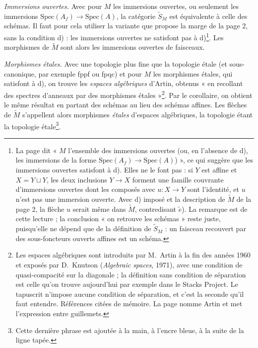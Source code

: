 \documentclass[11pt,a4paper]{article}
\begin{document}
\emph{Immersions ouvertes.} Avec pour $M$ les immersions ouvertes, ou seulement
les immersions $\mathrm{Spec}(A_f) \to \mathrm{Spec}(A)$, la catégorie
$\widetilde{S}_M$ est équivalente à celle des schémas. Il faut pour cela
utiliser la variante que propose la marge de la page 2, sans la condition d) :
les immersions ouvertes ne satisfont pas à d)\footnote{La page dit « $M$
l'ensemble des immersions ouvertes (ou, en l'absence de d), les immersions de
la forme $\mathrm{Spec}(A_f) \to \mathrm{Spec}(A)$) », ce qui suggère que les
immersions ouvertes satisfont à d). Elles ne le font pas : si $Y$ est affine et
$X = Y \sqcup Y$, les deux inclusions $Y \to X$ forment une famille couvrante
d'immersions ouvertes dont les composés avec $u : X \to Y$ sont l'identité, et
$u$ n'est pas une immersion ouverte. Avec d) imposé et la description de
$\widetilde{M}$ de la page 2, la flèche $u$ serait même dans $\widetilde{M}$,
contredisant $\tilde{e}$). La remarque est de cette lecture ; la conclusion
« on retrouve les schémas » reste juste, puisqu'elle ne dépend que de la
définition de $\widetilde{S}_M$ : un faisceau recouvert par des sous-foncteurs
ouverts affines est un schéma.}. Les morphismes de $\widetilde{M}$ sont alors
les immersions ouvertes de faisceaux.

\emph{Morphismes étales.} Avec une topologie plus fine que la topologie étale
(et sous-canonique, par exemple fppf ou fpqc) et pour $M$ les morphismes étales,
qui satisfont à d), on trouve les \emph{espaces algébriques} d'Artin, obtenus
« en recollant des spectres d'anneaux par des morphismes étales »\footnote{Les
espaces algébriques sont introduits par M.~Artin à la fin des années 1960 et
exposés par D.~Knutson (\emph{Algebraic spaces}, 1971), avec une condition de
quasi-compacité sur la diagonale ; la définition sans condition de séparation
est celle qu'on trouve aujourd'hui par exemple dans le Stacks Project. Le
tapuscrit n'impose aucune condition de séparation, et c'est la seconde qu'il
faut entendre. Références citées de mémoire. La page nomme Artin et met
l'expression entre guillemets.}. Par le corollaire, on obtient le même résultat
en partant des schémas au lieu des schémas affines. Les flèches de
$\widetilde{M}$ s'appellent alors morphismes \emph{étales} d'espaces
algébriques, la topologie étant la topologie étale\footnote{Cette dernière
phrase est ajoutée à la main, à l'encre bleue, à la suite de la ligne tapée.}.
\end{document}
